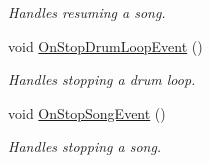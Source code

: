\begin{DoxyCompactItemize}
\begin{DoxyCompactList}\small\item\em Handles resuming a song. \end{DoxyCompactList}\item 
void \hyperlink{group___v_i_m_handlers_ga9d251d8b2036a3416680ced5d6125d0e}{On\+Stop\+Drum\+Loop\+Event} ()
\begin{DoxyCompactList}\small\item\em Handles stopping a drum loop. \end{DoxyCompactList}\item 
void \hyperlink{group___v_i_m_handlers_ga5d9afb7a74107b5c6016555f0bb0a0a8}{On\+Stop\+Song\+Event} ()
\begin{DoxyCompactList}\small\item\em Handles stopping a song. \end{DoxyCompactList}\end{DoxyCompactItemize}
